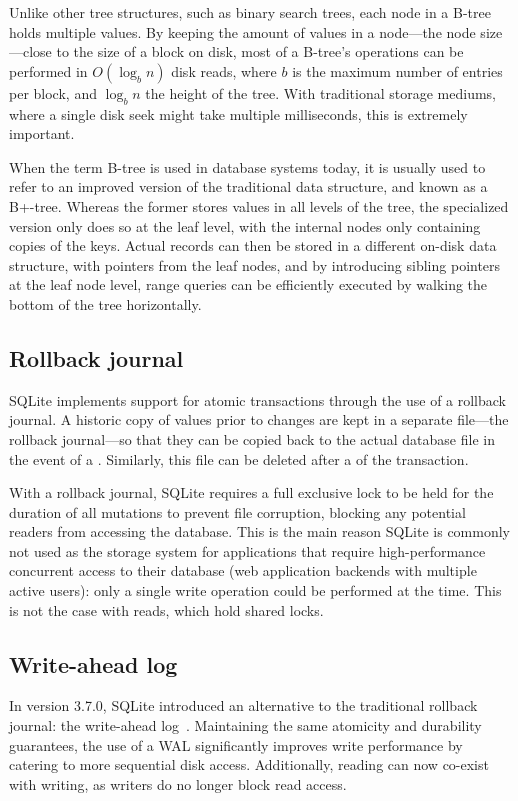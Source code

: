 Unlike other tree structures, such as binary search trees, each node in a B-tree
holds multiple values. By keeping the amount of values in a node---the node
size---close to the size of a block on disk, most of a B-tree's operations can
be performed in $ O(\log_b n) $ disk reads, where $ b $ is the maximum number of
entries per block, and $ \log_b n $ the height of the tree. With traditional
storage mediums, where a single disk seek might take multiple milliseconds, this
is extremely important.


When the term B-tree is used in database systems today, it is usually used to
refer to an improved version of the traditional data structure, and known as a
B+-tree. Whereas the former stores values in all levels of the tree, the
specialized version only does so at the leaf level, with the internal nodes only
containing copies of the keys. Actual records can then be stored in a different
on-disk data structure, with pointers from the leaf nodes, and by introducing
sibling pointers at the leaf node level, range queries can be efficiently
executed by walking the bottom of the tree horizontally.

\subsection{Rollback journal}\label{sec:sqlite-locks}
SQLite implements support for atomic transactions through the use of a rollback
journal. A historic copy of values prior to changes are kept in a separate
file---the rollback journal---so that they can be copied back to the actual
database file in the event of a . Similarly, this file can be
deleted after a  of the transaction.

With a rollback journal, SQLite requires a full exclusive lock to be held for
the duration of all mutations to prevent file corruption, blocking any potential
readers from accessing the database. This is the main reason SQLite is commonly
not used as the storage system for applications that require high-performance
concurrent access to their database (\eg web application backends with multiple
active users): only a single write operation could be performed at the time.
This is not the case with reads, which hold shared locks.

\subsection{Write-ahead log}\label{sec:sqlite-wal}
In version 3.7.0, SQLite introduced an alternative to the traditional rollback
journal: the write-ahead log~\cite{sqlite-wal}. Maintaining the same atomicity
and durability guarantees, the use of a WAL significantly improves write
performance by catering to more sequential disk access. Additionally, reading
can now co-exist with writing, as writers do no longer block read access.

